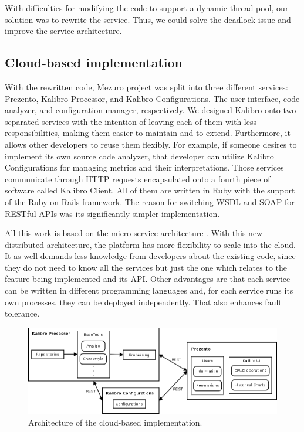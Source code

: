 With difficulties for modifying the code to support a dynamic thread pool, our
solution was to rewrite the service. Thus, we could solve the deadlock issue
and improve the service architecture.

\subsection{Cloud-based implementation}
\label{subsec:cloud-based-implementation}

With the rewritten code, Mezuro project was split into three different
services: Prezento, Kalibro Processor, and Kalibro Configurations. The user
interface, code analyzer, and configuration manager, respectively. We designed
Kalibro onto two separated services with the intention of leaving each of them
with less responsibilities, making them easier to maintain and to extend.
Furthermore, it allows other developers to reuse them flexibly. For example, if
someone desires to implement its own source code analyzer, that developer can
utilize Kalibro Configurations for managing metrics and their interpretations.
Those services communicate through HTTP requests encapsulated onto a fourth
piece of software called Kalibro Client.  All of them are written in Ruby with
the support of the Ruby on Rails framework. The reason for switching WSDL and
SOAP for RESTful APIs was its significantly simpler implementation.

All this work is based on the micro-service architecture
\cite{namiot2014micro}. With this new distributed architecture, the platform has
more flexibility to scale into the cloud. It as well demands less knowledge
from developers about the existing code, since they do not need to know all the
services but just the one which relates to the feature being implemented and
its API. Other advantages are that each service can be written in different
programming languages and, for each service runs its own processes, they can be
deployed independently. That also enhances fault tolerance.

\begin{figure}[htb]
  \centering
  \includegraphics[width=\textwidth]{images/mezuro-cloud-arch.png}
  \caption{Architecture of the cloud-based implementation.}
  \label{fig:mezuro-cloud-arch}
\end{figure}

